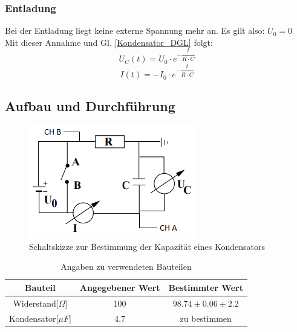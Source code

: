 \documentclass[12pt,a4paper]{article}
\begin{document}
\subsubsection{Entladung}
Bei der Entladung liegt keine externe Spannung mehr an. Es gilt also: $U_0 = 0$\\
Mit dieser Annahme und Gl. \ref{Kondensator_DGL} folgt:
\begin{equation}
U_C(t) = U_0 \cdot e^{-\dfrac{t}{R\cdot C}}
\end{equation}
\begin{equation}
I(t) = -I_0 \cdot e^{-\dfrac{t}{R\cdot C}}
\end{equation}
\subsection{Aufbau und Durchführung}
\begin{figure}
\begin{center}
\includegraphics[width=0.75\linewidth]{Bilder/Kondensator_Aufbau}
\caption[Aufbau Kondensator]{Schaltskizze zur Bestimmung der Kapazität eines Kondensators}
\label{fig:Kond_Aufbau}
\end{center}
\end{figure}

\begin{table}[H]
\begin{center}
\begin{tabular}{|c|c|c|}
\hline 
Bauteil & Angegebener Wert & Bestimmter Wert \\ 
\hline 
Widerstand[$\Omega$] & 100 & $98.74\pm 0.06\pm2.2$ \\ 
\hline 
Kondensator[$\mu F$] & 4.7 & zu bestimmen \\ 
\hline 
\end{tabular} 
\end{center}
\caption{Angaben zu verwendeten Bauteilen}
\label{tab:Kond_Hersteller} 
\end{table}
\end{document}
